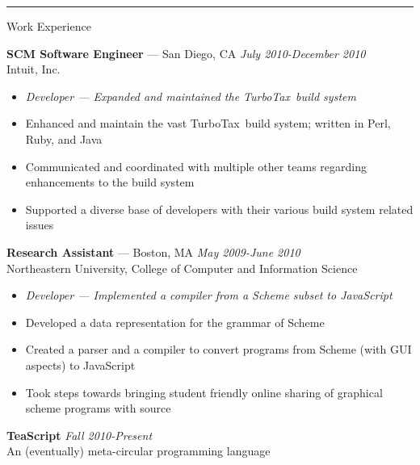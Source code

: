\documentclass[10pt]{letter}
\begin{document}
\rule{\linewidth}{.5pt}

{\Large Work Experience}
\begin{tabbing}
{\large \bf SCM Software Engineer} --- San Diego, CA \` \textit{July 2010-December 2010} \\
Intuit, Inc.

\end{tabbing}\vspace{-10pt}

\begin{itemize}
\setlength\itemsep{1pt}
\item [] \textit{Developer --- Expanded and maintained the TurboTax\textregistered~build system}
\item Enhanced and maintain the vast TurboTax\textregistered~build system; written in Perl, Ruby, and Java
\item Communicated and coordinated with multiple other teams regarding enhancements to the build system
\item Supported a diverse base of developers with their various build system related issues
\end{itemize}

\begin{tabbing}
{\large \bf Research Assistant} --- Boston, MA \` \textit{May 2009-June 2010} \\
Northeastern University, College of Computer and Information Science
\end{tabbing}\vspace{-10pt}
\begin{itemize}
\setlength\itemsep{1pt}
\item [] \textit{Developer --- Implemented a compiler from a Scheme subset to JavaScript}
\item Developed a data representation for the grammar of Scheme
\item Created a parser and a compiler to convert programs from Scheme (with GUI aspects) to JavaScript
\item Took steps towards bringing student friendly online sharing of graphical scheme programs with source
\end{itemize}

\begin{tabbing}
{\large \bf TeaScript} \` \textit{Fall 2010-Present} \\
An (eventually) meta-circular programming language

\end{tabbing}\vspace{-10pt}
\end{document}
